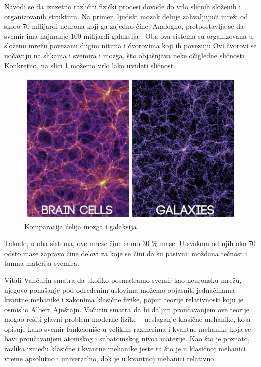 \documentclass[a4paper]{article}
\begin{document}
Navodi se da izuzetno različiti fizički procesi dovode do vrlo sličnih složenih i organizovanih struktura. Na primer, ljudski mozak deluje zahvaljujući mreži od skoro 70 milijardi neurona koji ga zajedno čine. Analogno, pretpostavlja se da svemir ima najmanje 100 milijardi galaksija \cite{6}. Oba ova sistema su organizovana u složenu mrežu povezanu dugim nitima i čvorovima koji ih povezuju Ovi čvorovi se uočavaju na slikama i svemira i mozga, što objašnjava neke očigledne sličnosti. Konkretno, na slici \ref{fig:komparacija} možemo vrlo lako uvideti sličnost.

\begin{figure}[h!]
\begin{center}
\includegraphics[scale=0.2]{komparacija.jpeg}
\end{center}
\caption{Komparacija ćelija mozga i galaksija}
\label{fig:komparacija}
\end{figure}

\justifying
Takođe, u oba sistema, ove mreže čine samo 30 \% mase. U svakom od njih oko 70 odsto mase zapravo čine delovi za koje se čini da su pasivni: moždana tečnost i tamna materija svemira.

Vitali Vančurin smatra da ukoliko posmatramo svemir kao neuronsku mrežu, njegovo ponašanje pod određenim uslovima možemo objasniti jednačinama kvantne mehanike i zakonima klasične fizike, poput teorije relativnosti koju je osmislio Albert Ajnštajn. Vačurin smatra da bi daljim proučavanjem ove teorije mogao rešiti glavni problem moderne fizike \--\ neslaganje klasične mehanike,
koja opisuje kako svemir funkcioniše u velikim razmerima i kvantne mehanike koja se bavi proučavanjem atomskog i subatomskog nivoa materije.  Kao što je poznato, razlika između klasične i kvantne mehanike jeste ta što je u klasičnoj mehanici vreme apsolutno i univerzalno, dok je u kvantnoj mehanici relativno.
\end{document}
